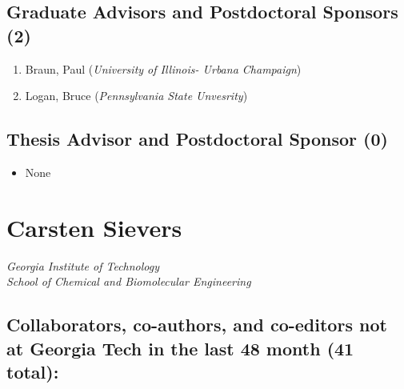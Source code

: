 \subsection{Graduate Advisors and Postdoctoral Sponsors
(2)}\label{graduate-advisors-and-postdoctoral-sponsors-2}

\begin{enumerate}
\def\labelenumi{\arabic{enumi}.}
\itemsep1pt\parskip0pt
\item
  Braun, Paul (\emph{University of Illinois- Urbana Champaign})
\item
  Logan, Bruce (\emph{Pennsylvania State Unvesrity})
\end{enumerate}

\subsection{Thesis Advisor and Postdoctoral Sponsor
(0)}\label{thesis-advisor-and-postdoctoral-sponsor-0}

\begin{itemize}
\itemsep1pt\parskip0pt
\item
  None
\end{itemize}


\section{Carsten Sievers}

\emph{Georgia Institute of Technology}\\\emph{School of Chemical and
Biomolecular Engineering}

\subsection{Collaborators, co-authors, and co-editors not at Georgia Tech in
the last 48 month (41 total):}

